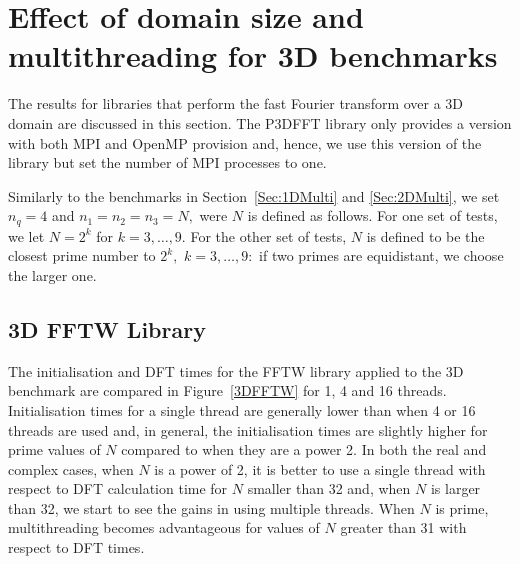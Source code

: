 \documentclass[a4paper]{article}
\begin{document}
\section{Effect of domain size and multithreading for 3D benchmarks}\label{Sec:3DMulti}
The results for libraries that perform the fast Fourier transform over
a 3D domain are discussed in this section. The P3DFFT library only
provides a version with both MPI and OpenMP provision and, hence, we
use this version of the library but set the number of MPI processes to
one.

Similarly to the benchmarks in Section~\ref{Sec:1DMulti} and \ref{Sec:2DMulti}, we set
$n_q=4$ and $n_1=n_2=n_3=N,$ were $N$ is defined as follows.  For one
set of tests, we let $N=2^k$ for $k=3,\ldots,9.$ For the other set of
tests, $N$ is defined to be the closest prime number to $2^k,$
$k=3,\ldots,9:$ if two primes are equidistant, we choose the larger
one.

\subsection{3D FFTW Library}\label{Sec:3DFFTW}
The initialisation and DFT times for the FFTW library applied to the
3D benchmark are compared in Figure~\ref{3DFFTW} for 1, 4 and 16
threads. Initialisation times for a single thread are generally lower
than when 4 or 16 threads are used and, in general, the initialisation
times are slightly higher for prime values of $N$ compared to when
they are a power 2. In both the real and complex cases, when $N$ is a
power of 2, it is better to use a single thread with respect to DFT
calculation time for $N$ smaller than 32 and, when $N$ is larger than
32, we start to see the gains in using multiple threads. When $N$ is
prime, multithreading becomes advantageous for values of $N$ greater
than 31 with respect to DFT times. 
\end{document}
